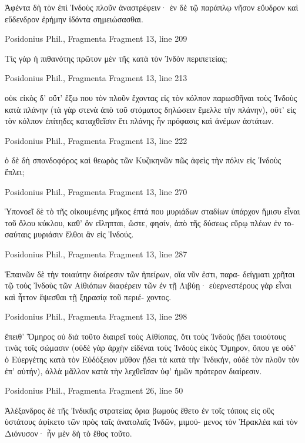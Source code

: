 \documentclass[12pt,letterpaper,twoside,final]{memoir}
\begin{document}
\begin{greek}
Ἀφέντα δὴ τὸν ἐπὶ Ἰνδοὺς πλοῦν ἀναστρέφειν· ἐν δὲ τῷ παράπλῳ 
νῆσον εὔυδρον καὶ εὔδενδρον ἐρήμην ἰδόντα σημειώσασθαι. 



Posidonius Phil., Fragmenta 
Fragment 13, line 209

Τίς γὰρ ἡ πιθανότης πρῶτον μὲν τῆς κατὰ τὸν Ἰνδὸν περιπετείας; 



Posidonius Phil., Fragmenta 
Fragment 13, line 213

οὐκ εἰκὸς δ' οὔτ' ἔξω που τὸν πλοῦν ἔχοντας εἰς τὸν κόλπον παρωσθῆναι 
τοὺς Ἰνδοὺς κατὰ πλάνην (τὰ γὰρ στενὰ ἀπὸ τοῦ στόματος δηλώσειν 
ἔμελλε τὴν πλάνην), οὔτ' εἰς τὸν κόλπον ἐπίτηδες καταχθεῖσιν ἔτι πλάνης 
ἦν πρόφασις καὶ ἀνέμων ἀστάτων. 



Posidonius Phil., Fragmenta 
Fragment 13, line 222

     ὁ δὲ δὴ σπονδοφόρος καὶ θεωρὸς τῶν Κυζικηνῶν πῶς ἀφεὶς τὴν 
πόλιν εἰς Ἰνδοὺς ἔπλει; 



Posidonius Phil., Fragmenta 
Fragment 13, line 270

Ὑπονοεῖ δὲ τὸ τῆς οἰκουμένης μῆκος ἑπτά που μυριάδων σταδίων 
ὑπάρχον ἥμισυ εἶναι τοῦ ὅλου κύκλου, καθ' ὃν εἴληπται, ὥστε, φησίν, 
ἀπὸ τῆς δύσεως εὔρῳ πλέων ἐν τοσαύταις μυριάσιν ἔλθοι ἂν εἰς Ἰνδούς. 



Posidonius Phil., Fragmenta 
Fragment 13, line 287

Ἐπαινῶν δὲ τὴν τοιαύτην διαίρεσιν τῶν ἠπείρων, οἵα νῦν ἐστι, παρα-
δείγματι χρῆται τῷ τοὺς Ἰνδοὺς τῶν Αἰθιόπων διαφέρειν τῶν ἐν τῇ 
Λιβύῃ· εὐερνεστέρους γὰρ εἶναι καὶ ἧττον ἕψεσθαι τῇ ξηρασίᾳ τοῦ περιέ-
χοντος. 



Posidonius Phil., Fragmenta 
Fragment 13, line 298

           ἔπειθ' Ὅμηρος οὐ διὰ τοῦτο διαιρεῖ τοὺς Αἰθίοπας, ὅτι τοὺς 
Ἰνδοὺς ᾔδει τοιούτους τινὰς τοῖς σώμασιν (οὐδὲ γὰρ ἀρχὴν εἰδέναι τοὺς 
Ἰνδοὺς εἰκὸς Ὅμηρον, ὅπου γε οὐδ' ὁ Εὐεργέτης κατὰ τὸν Εὐδόξειον 
μῦθον ᾔδει τὰ κατὰ τὴν Ἰνδικήν, οὐδὲ τὸν πλοῦν τὸν ἐπ' αὐτήν), ἀλλὰ 
μᾶλλον κατὰ τὴν λεχθεῖσαν ὑφ' ἡμῶν πρότερον διαίρεσιν. 



Posidonius Phil., Fragmenta 
Fragment 26, line 50

Ἀλέξανδρος δὲ τῆς Ἰνδικῆς στρατείας ὅρια βωμοὺς ἔθετο ἐν τοῖς 
τόποις εἰς οὓς ὑστάτους ἀφίκετο τῶν πρὸς ταῖς ἀνατολαῖς Ἰνδῶν, μιμού-
μενος τὸν Ἡρακλέα καὶ τὸν Διόνυσον· ἦν μὲν δὴ τὸ ἔθος τοῦτο. 




\end{greek}
\end{document}
